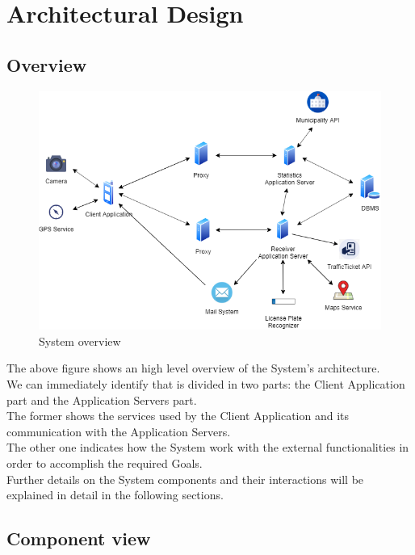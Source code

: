 \section{Architectural Design}

\subsection{Overview}
\begin{figure}[H]
          \includegraphics[scale=0.54,left]{Images/overview.png}
        \caption{System overview}
\end{figure}
The above figure shows an high level overview of the System's architecture.\\
We can immediately identify that is divided in two parts: the Client Application part and the Application Servers part.\\
The former shows the services used by the Client Application and its communication with the Application Servers.\\
The other one indicates how the System work with the external functionalities in order to accomplish the required Goals.\\
Further details on the System components and their interactions will be explained in detail in the following sections.

\subsection{Component view}

